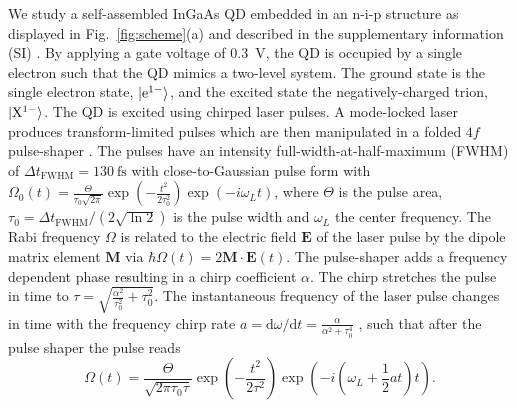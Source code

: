 \documentclass[aps,prl,reprint,superscriptaddress]{revtex4-1}
\begin{document}
We study a self-assembled InGaAs QD embedded in an n-i-p structure as displayed in Fig.\ \ref{fig:scheme}(a) and described in the supplementary information (SI) \cite{SI}. By applying a gate voltage of \SI{0.3}{\volt}, the QD is occupied by a single electron such that the QD mimics a two-level system. The ground state is the single electron state, $\ket{\mathrm{e}^{1-}}$, and the excited state the negatively-charged trion, $\ket{\mathrm{X}^{1-}}$. The QD is excited using chirped laser pulses. A mode-locked laser produces transform-limited pulses which are then manipulated in a folded $4f$ pulse-shaper \cite{Martinez1987}. The pulses have an intensity full-width-at-half-maximum (FWHM) of $\Delta t_\mathrm{FWHM}=\SI{130}{\femto\second}$ with close-to-Gaussian pulse form with $\Omega_0(t)=\frac{\Theta}{\tau_0	\sqrt{2\pi}}\exp\left(-\frac{t^2}{2\tau_0^2}\right)\exp\left(-i\omega_L t\right)$, where $\Theta$ is the pulse area, $\tau_0=\Delta t_\mathrm{FWHM}/(2\sqrt{\ln{2}})$ is the pulse width and $\omega_L$ the center frequency. The Rabi frequency $\Omega$ is related to the electric field $\mathbf{E}$ of the laser pulse by the dipole matrix element $\mathbf{M}$ via $\hbar\Omega(t)=2\mathbf{M}\cdot \mathbf{E}(t)$.
The pulse-shaper adds a frequency dependent phase resulting in a chirp coefficient $\alpha$. The chirp stretches the pulse in time to $\tau=\sqrt{\frac{\alpha^2}{\tau_0^2}+\tau_0^2}$. The instantaneous frequency of the laser pulse changes in time with the frequency chirp rate $a=\mathrm{d}\omega/\mathrm{d}t=\frac{\alpha}{\alpha^2+\tau_0^4}$ \cite{Malinovsky2001}, such that after the pulse shaper the pulse reads
\begin{equation}
\Omega(t)=\frac{\Theta}{\sqrt{2\pi\tau_0\tau}}\exp\left(-\frac{t^2}{2\tau^2}\right)
\exp\left(-i(\omega_L+\frac{1}{2}a t) t\right).
\end{equation}
\end{document}
